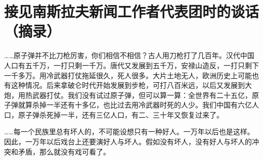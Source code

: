 \section[接见南斯拉夫新闻工作者代表团时的谈话（摘录）（一九五六年四月二十一日）]{接见南斯拉夫新闻工作者代表团时的谈话（摘录）}


……原子弹并不比刀枪厉害，你们相信不相信？古人用刀枪打了几百年。汉代中国人口有五千万，一打只剩一千万。唐代又发展到五千万，安禄山造反，一打只剩下一千多万。用冷武器打仗拖延很久，死人很多。大片土地无人，欧洲历史上可能也有这种情况。后来拿破仑时代开始发展到步枪，可打八百米远，以后又发展到大炮，用热武器打仗。我们没有试过原子弹，但可以算一算：全世界有二十五亿，原子弹就算杀掉一半还有十多亿，也比过去用冷武器时死的人少。我们中国有六亿人口，原子弹杀死掉一半，还有三亿人口，有二、三十年又恢复过来了。

……每一个民族里总有坏人的，不可能设想只有一种好人。一万年以后也是这样。因此，一万年以后戏台上还要演好人与坏人。假如没有坏人，没有好人与坏人的冲突和矛盾，那么就没有戏可看了。


